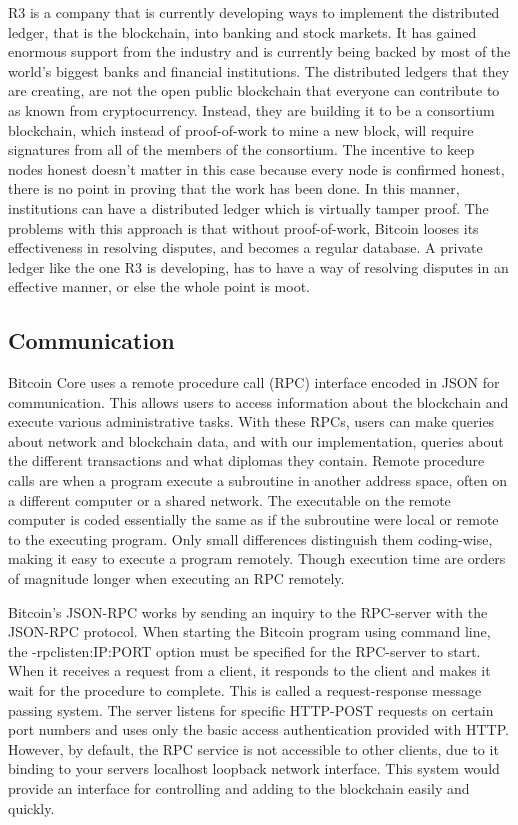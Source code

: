 \documentclass[12pt]{article}
\begin{document}
R3 is a company that is currently developing ways to implement the distributed ledger, that is the blockchain, into banking and stock markets. It has gained enormous support from the industry and is currently being backed by most of the world's biggest banks and financial institutions. The distributed ledgers that they are creating, are not the open public blockchain that everyone can contribute to as known from cryptocurrency. Instead, they are building it to be a consortium blockchain, which instead of proof-of-work to mine a new block, will require signatures from all of the members of the consortium. The incentive to keep nodes honest doesn't matter in this case because every node is confirmed honest, there is no point in proving that the work has been done. In this manner, institutions can have a distributed ledger which is virtually tamper proof. The problems with this approach is that without proof-of-work, Bitcoin looses its effectiveness in resolving disputes, and becomes a regular database. A private ledger like the one R3 is developing, has to have a way of resolving disputes in an effective manner, or else the whole point is moot. 

\subsection{Communication}
Bitcoin Core uses a remote procedure call (RPC) interface encoded in JSON for communication. This allows users to access information about the blockchain and execute various administrative tasks. With these RPCs, users can make queries about network and blockchain data, and with our implementation, queries about the different transactions and what diplomas they contain. Remote procedure calls are when a program execute a subroutine in another address space, often on a different computer or a shared network. The executable on the remote computer is coded essentially the same as if the subroutine were local or remote to the executing program. Only small differences distinguish them coding-wise, making it easy to execute a program remotely. Though execution time are orders of magnitude longer when executing an RPC remotely. 

Bitcoin's JSON-RPC works by sending an inquiry to the RPC-server with the JSON-RPC protocol. When starting the Bitcoin program using command line, the -rpclisten:IP:PORT option must be specified for the RPC-server to start. When it receives a request from a client, it responds to the client and makes it wait for the procedure to complete. This is called a request-response message passing system. The server listens for specific HTTP-POST requests on certain port numbers and uses only the basic access authentication provided with HTTP. However, by default, the RPC service is not accessible to other clients, due to it binding to your servers localhost loopback network interface. This system would provide an interface for controlling and adding to the blockchain easily and quickly.
\end{document}
